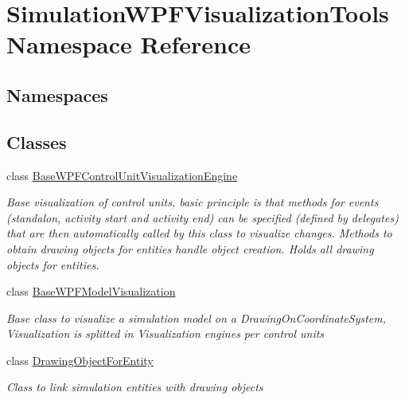 \hypertarget{namespace_simulation_w_p_f_visualization_tools}{}\section{Simulation\+W\+P\+F\+Visualization\+Tools Namespace Reference}
\label{namespace_simulation_w_p_f_visualization_tools}
\subsection*{Namespaces}
\begin{DoxyCompactItemize}
\end{DoxyCompactItemize}
\subsection*{Classes}
\begin{DoxyCompactItemize}
\item 
class \hyperlink{class_simulation_w_p_f_visualization_tools_1_1_base_w_p_f_control_unit_visualization_engine}{Base\+W\+P\+F\+Control\+Unit\+Visualization\+Engine}
\begin{DoxyCompactList}\small\item\em Base visualization of control units, basic principle is that methods for events (standalon, activity start and activity end) can be specified (defined by delegates) that are then automatically called by this class to visualize changes. Methods to obtain drawing objects for entities handle object creation. Holds all drawing objects for entities. \end{DoxyCompactList}\item 
class \hyperlink{class_simulation_w_p_f_visualization_tools_1_1_base_w_p_f_model_visualization}{Base\+W\+P\+F\+Model\+Visualization}
\begin{DoxyCompactList}\small\item\em Base class to visualize a simulation model on a Drawing\+On\+Coordinate\+System, Visualization is splitted in Visualization engines per control units \end{DoxyCompactList}\item 
class \hyperlink{class_simulation_w_p_f_visualization_tools_1_1_drawing_object_for_entity}{Drawing\+Object\+For\+Entity}
\begin{DoxyCompactList}\small\item\em Class to link simulation entities with drawing objects \end{DoxyCompactList}\end{DoxyCompactItemize}
